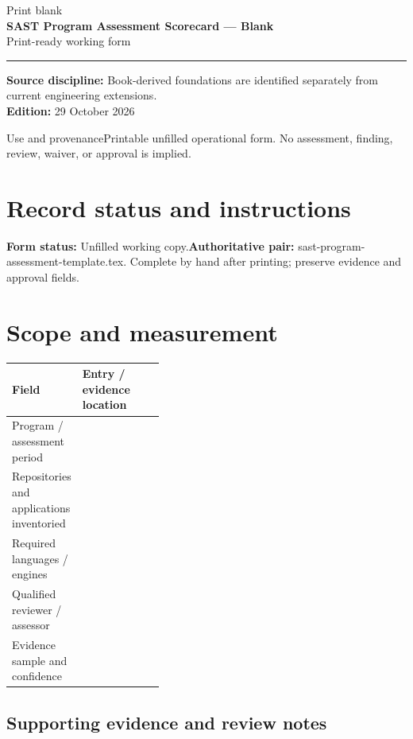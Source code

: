 \documentclass[10pt,letterpaper]{article}
\newcommand{\writearea}[1]{\par\begin{tcolorbox}[colback=white,colframe=linegray,boxrule=0.5pt,height=#1,sharp corners]\mbox{}\end{tcolorbox}\par}
\begin{document}
\hypersetup{pageanchor=false}%
\begin{titlepage}
\vspace*{1.0in}
{\color{bluegray}\Large Print blank}\\[1.0em]
{\color{navy}\Huge\bfseries SAST Program Assessment Scorecard --- Blank}\\[0.7em]
{\Large Print-ready working form}\\[2.0em]
\rule{\linewidth}{1.0pt}
\vfill
\textbf{Source discipline:} Book-derived foundations are identified separately from current engineering extensions.\\
\textbf{Edition:} 29 October 2026
\end{titlepage}\hypersetup{pageanchor=true}
\tableofcontents
\clearpage
\begin{focusbox}{Use and provenance}Printable unfilled operational form. No assessment, finding, review, waiver, or approval is implied.\end{focusbox}
\section{Record status and instructions}
\textbf{Form status:} Unfilled working copy.\quad\textbf{Authoritative pair:} sast-program-assessment-template.tex. Complete by hand after printing; preserve evidence and approval fields.

\section{Scope and measurement}
\begin{tabularx}{\linewidth}{@{}p{0.38\linewidth}Y@{}}
\toprule Field & Entry / evidence location\\\midrule
Program / assessment period & \\[1.0em]
\midrule
Repositories and applications inventoried & \\[1.0em]
\midrule
Required languages / engines & \\[1.0em]
\midrule
Qualified reviewer / assessor & \\[1.0em]
\midrule
Evidence sample and confidence & \\[1.0em]
\midrule
\end{tabularx}
\subsection{Supporting evidence and review notes}
\writearea{1.45in}
\clearpage
\end{document}
